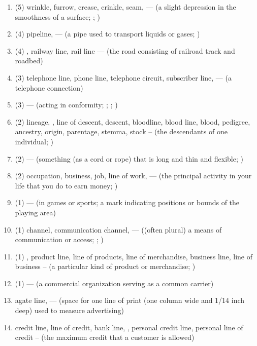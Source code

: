 \documentclass[a4paper,landscape,headrule,footrule]{foils}
\begin{document}
\begin{enumerate}
\item (5) wrinkle, furrow, crease, crinkle, seam,  --- (a slight depression in the smoothness of a surface; ; )
\item (4) pipeline,  --- (a pipe used to transport liquids or gases; )
\item (4) , railway line, rail line --- (the road consisting of railroad track and roadbed)
\item (3) telephone line, phone line, telephone circuit, subscriber line,  --- (a telephone connection)
\item (3)  --- (acting in conformity; ; ; )
\item (2) lineage, , line of descent, descent, bloodline, blood line, blood, pedigree, ancestry, origin, parentage, stemma, stock -- (the descendants of one individual; )
\item (2)  --- (something (as a cord or rope) that is long and thin and flexible; )
\item (2) occupation, business, job, line of work,  --- (the principal activity in your life that you do to earn money; )
\item (1)  --- (in games or sports; a mark indicating positions or bounds of the playing area)
\item (1) channel, communication channel,  --- ((often plural) a means of communication or access; ; )
\item (1) , product line, line of products, line of merchandise, business line, line of business -- (a particular kind of product or merchandise; )
\item (1)  --- (a commercial organization serving as a common carrier)
\item agate line,  --- (space for one line of print (one column wide and 1/14 inch deep) used to measure advertising)
\item credit line, line of credit, bank line, , personal credit line, personal line of credit -- (the maximum credit that a customer is allowed)

\end{enumerate}
\end{document}

